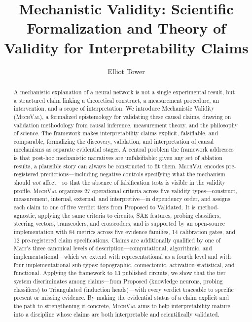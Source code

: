 \documentclass[10pt]{article}
\title{Mechanistic Validity: Scientific Formalization and Theory of Validity for Interpretability Claims}
\author[1]{Elliot Tower}
\affil[1]{Independent Researcher, \texttt{elliot@elliottower.com}}
\date{}
\newcommand{\mechval}{\textsc{MechVal}}
\begin{document}
\maketitle

\begin{abstract}
A mechanistic explanation of a neural network is not a single experimental result, but a structured claim linking a theoretical construct, a measurement procedure, an intervention, and a scope of interpretation. We introduce Mechanistic Validity (\mechval{}), a formalized epistemology for validating these causal claims, drawing on validation methodology from causal inference, measurement theory, and the philosophy of science. The framework makes interpretability claims explicit, falsifiable, and comparable, formalizing the discovery, validation, and interpretation of causal mechanisms as separate evidential stages. A central problem the framework addresses is that post-hoc mechanistic narratives are unfalsifiable: given any set of ablation results, a plausible story can always be constructed to fit them. \mechval{} encodes pre-registered predictions---including negative controls specifying what the mechanism should \emph{not} affect---so that the absence of falsification tests is visible in the validity profile. \mechval{} organizes 27 operational criteria across five validity types---construct, measurement, internal, external, and interpretive---in dependency order, and assigns each claim to one of five verdict tiers from Proposed to Validated. It is method-agnostic, applying the same criteria to circuits, SAE features, probing classifiers, steering vectors, transcoders, and crosscoders, and is supported by an open-source implementation with 84 metrics across five evidence families, 14 calibration gates, and 12 pre-registered claim specifications. Claims are additionally qualified by one of Marr's \citeyearpar{marr1982vision} three canonical levels of description---computational, algorithmic, and implementational---which we extend with representational as a fourth level and with four implementational sub-types: topographic, connectomic, activation-statistical, and functional. Applying the framework to 13 published circuits, we show that the tier system discriminates among claims---from Proposed (knowledge neurons, probing classifiers) to Triangulated (induction heads)---with every verdict traceable to specific present or missing evidence. By making the evidential status of a claim explicit and the path to strengthening it concrete, \mechval{} aims to help interpretability mature into a discipline whose claims are both interpretable and scientifically validated.
\end{abstract}
\end{document}
